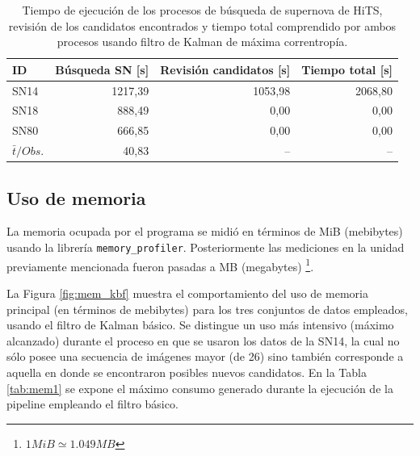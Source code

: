 \begin{table}[h!]
\centering
\caption{Tiempo de ejecuci\'on de los procesos de b\'usqueda de supernova de HiTS, revisi\'on de los candidatos encontrados y tiempo total comprendido por ambos procesos usando filtro de Kalman de m\'axima correntrop\'ia.}
\begin{tabular}{|l|r|r|r|}
\hline
\textbf{ID} & \textbf{B\'usqueda SN [s]} & \textbf{Revisi\'on candidatos [s]} & \textbf{Tiempo total [s]} \\ \hline
\hline
SN14 & 1217,39 & 1053,98 & 2068,80\\\hline
SN18 & 888,49 & 0,00 & 0,00\\\hline
SN80 & 666,85 & 0,00& 0,00\\\hline \hline
 $\bar{t}/Obs. $& 40,83 & -- & --\\\hline 
\end{tabular}
\label{tab:t6}
\end{table}

\subsection{Uso de memoria}

La memoria ocupada por el programa se midi\'o en t\'erminos de MiB (mebibytes) usando la librer\'ia \texttt{memory\_profiler}. Posteriormente las mediciones en la unidad previamente mencionada fueron pasadas a MB (megabytes) \footnote{$1MiB\simeq 1.049MB$ }.
\bigskip

La Figura \ref{fig:mem_kbf} muestra el comportamiento del uso de memoria principal (en t\'erminos de mebibytes) para los tres conjuntos de datos empleados, usando el filtro de Kalman b\'asico. Se distingue un uso m\'as intensivo (m\'aximo alcanzado) durante el proceso en que se usaron los datos de la SN14, la cual no s\'olo posee una secuencia de im\'agenes mayor (de 26) sino tambi\'en corresponde a aquella en donde se encontraron posibles nuevos candidatos. En la Tabla \ref{tab:mem1} se expone el m\'aximo consumo generado durante la ejecuci\'on de la pipeline empleando el filtro b\'asico.
\bigskip

